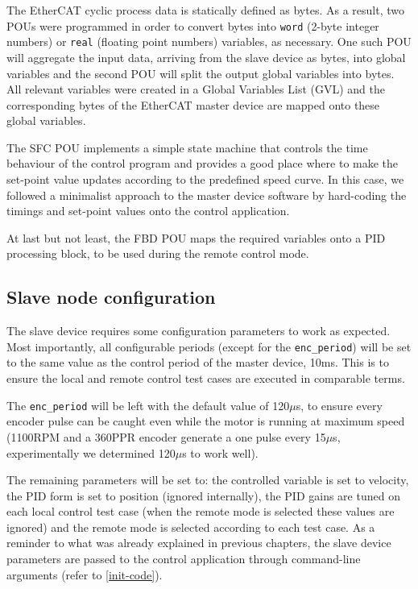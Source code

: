 The EtherCAT cyclic process data is statically defined as bytes.
As a result, two POUs were programmed in order to convert bytes into \verb|word| (2-byte integer numbers) or \verb|real| (floating point numbers) variables, as necessary.
One such POU will aggregate the input data, arriving from the slave device as bytes, into global variables and the second POU will split the output global variables into bytes.
All relevant variables were created in a Global Variables List (GVL) and the corresponding bytes of the EtherCAT master device are mapped onto these global variables.

The SFC POU implements a simple state machine that controls the time behaviour of the control program and provides a good place where to make the set-point value updates according to the predefined speed curve.
In this case, we followed a minimalist approach to the master device software by hard-coding the timings and set-point values onto the control application.

At last but not least, the FBD POU maps the required variables onto a PID processing block, to be used during the remote control mode.

\subsection{Slave node configuration}
The slave device requires some configuration parameters to work as expected.
Most importantly, all configurable periods (except for the \verb|enc_period|) will be set to the same value as the control period of the master device, 10ms.
This is to ensure the local and remote control test cases are executed in comparable terms.

The \verb|enc_period| will be left with the default value of 120$\mu$s, to ensure every encoder pulse can be caught even while the motor is running at maximum speed (1100RPM and a 360PPR encoder generate a one pulse every 15$\mu$s, experimentally we determined 120$\mu$s to work well).

The remaining parameters will be set to: the controlled variable is set to velocity, the PID form is set to position (ignored internally), the PID gains are tuned on each local control test case (when the remote mode is selected these values are ignored) and the remote mode is selected according to each test case.
As a reminder to what was already explained in previous chapters, the slave device parameters are passed to the control application through command-line arguments (refer to \autoref{init-code}).

